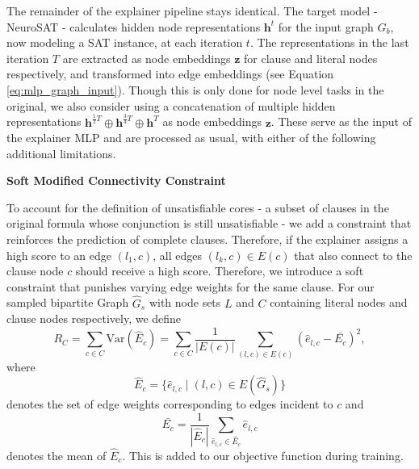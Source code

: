 The remainder of the explainer pipeline stays identical. The target model - NeuroSAT - calculates hidden node representations $\mathbf{h}^t$ for the input graph $G_b$, now modeling a SAT instance, at each iteration $t$. The representations in the last iteration $T$ are extracted as node embeddings $\mathbf{z}$ for clause and literal nodes respectively, and transformed into edge embeddings (see Equation \ref{eq:mlp_graph_input}). Though this is only done for node level tasks in the original, we also consider using a concatenation of multiple hidden representations $\mathbf{h}^{\frac{1}{2}T} \oplus \mathbf{h}^{\frac{3}{4}T} \oplus \mathbf{h}^T$ as node embeddings $\mathbf{z}$. These serve as the input of the explainer MLP and are processed as usual, with either of the following additional limitations. \bigskip

\newpage
\textbf{Soft Modified Connectivity Constraint}\par
To account for the definition of unsatisfiable cores - a subset of clauses in the original formula whose conjunction is still unsatisfiable - we add a constraint that reinforces the prediction of complete clauses. Therefore, if the explainer assigns a high score to an edge $(l_1,c)$, all edges $(l_k,c) \in E(c)$ that also connect to the clause node $c$ should receive a high score. Therefore, we introduce a soft constraint that punishes varying edge weights for the same clause. For our sampled bipartite Graph $\hat{G}_s$ with node sets $L$ and $C$ containing literal nodes and clause nodes respectively, we define
\begin{equation}
    \label{eq:soft_restraint}
    R_C = \sum_{c \in C}  \text{Var}(\hat{E}_c) = \sum_{c \in C} \frac{1}{|E(c)|} \sum_{(l,c) \in E(c)} (\hat{e}_{l,c} - \bar{E_c})^2,
\end{equation}
where
\begin{equation}
    \hat{E}_c = \{\hat{e}_{l,c} \mid (l,c)\in E(\hat{G}_s)\}
\end{equation}
denotes the set of edge weights corresponding to edges incident to $c$ and 
\begin{equation}
    \bar{E_c} = \frac{1}{|\hat{E}_c|}\sum_{\hat{e}_{l,c} \in \hat{E}_c} \hat{e}_{l,c}
\end{equation}
denotes the mean of $\hat{E}_c$. This is added to our objective function during training. \bigskip


